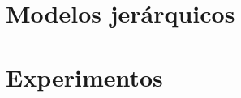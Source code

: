 \documentclass[a4paper,11pt]{book}
\renewcommand{\headrulewidth}{0pt}
\theoremstyle{definition} \newtheorem{axiom}{Axioma}
\begin{document}
\chapter{Modelos jer\'arquicos}
\label{cap:modelos_jerarquicos}


\chapter{Experimentos}




\appendix
\noappendicestocpagenum
\addappheadtotoc

\pagestyle{fancy}
\fancyhead[LO]{\leftmark}
\renewcommand{\headrulewidth}{0.5pt}



%

\end{document}
